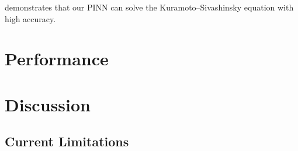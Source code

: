 \inputminted[linenos, breaklines, fontsize=\scriptsize, frame=single, framesep=10pt]{julia}{../code/pinn.jl}

 demonstrates that our PINN can solve the Kuramoto–Sivashinsky equation with high accuracy.

\section{Performance}
\label{sec:performance_lux}


\section{Discussion}
\label{sec:discussion_lux}

\subsection{Current Limitations}
\label{subsec:current_limitations}
